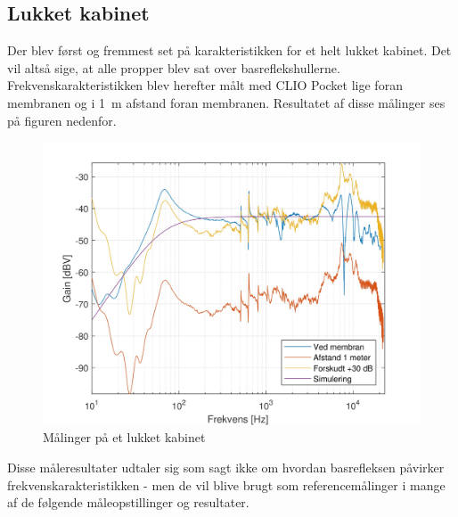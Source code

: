 \newpage
\subsection{Lukket kabinet}
Der blev først og fremmest set på karakteristikken for et helt lukket kabinet. Det vil altså sige, at alle propper blev sat over basreflekshullerne. Frekvenskarakteristikken blev herefter målt med CLIO Pocket lige foran membranen og i \SI{1}{\meter} afstand foran membranen. Resultatet af disse målinger ses på figuren nedenfor.
\begin{figure}[H]
	\centering
	\vspace{-12pt}
	\includegraphics[width=\textwidth]{Billeder/Grafer/ClosedCabinet}
	\caption{Målinger på et lukket kabinet}
\end{figure}

Disse måleresultater udtaler sig som sagt ikke om hvordan basrefleksen påvirker frekvenskarakteristikken - men de vil blive brugt som referencemålinger i mange af de følgende måleopstillinger og resultater.

